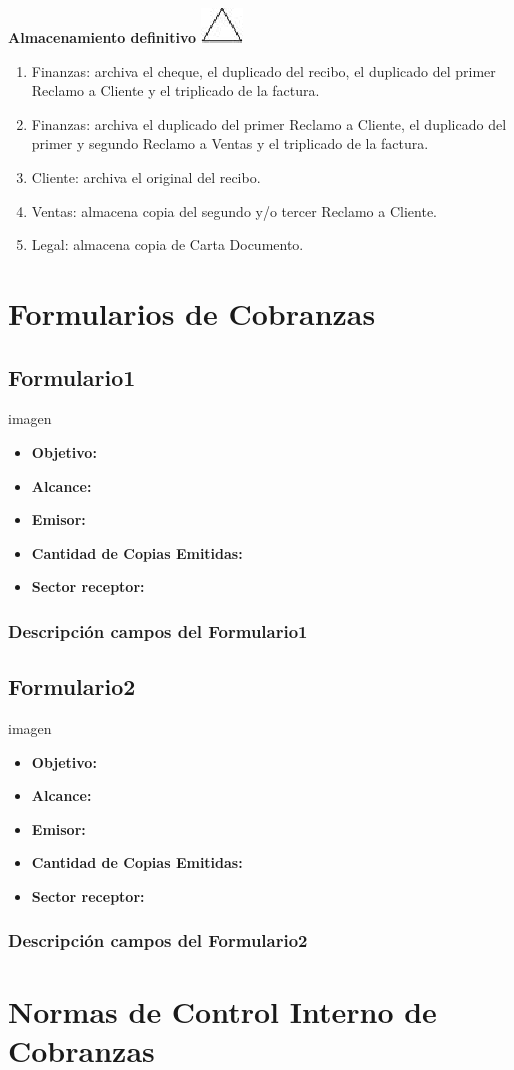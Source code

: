 \begin{center}
  \textbf{Almacenamiento definitivo}
  \includegraphics{./Images/Simbolos/simbolo-Almacenamiento-Definitivo.png}
\end{center}
\begin{enumerate}
\item Finanzas: archiva el cheque, el duplicado del recibo, el duplicado del primer Reclamo a Cliente y el triplicado de la factura.
\item Finanzas: archiva el duplicado del primer Reclamo a Cliente, el duplicado del primer y segundo Reclamo a Ventas y el triplicado de la factura.
\item Cliente: archiva el original del recibo.
\item Ventas: almacena copia del segundo y/o tercer Reclamo a Cliente.
\item Legal: almacena copia de Carta Documento.
\end{enumerate}

\pagebreak
\section{Formularios de Cobranzas}
\subsection{Formulario1}
imagen
\begin{itemize}
  \item \textbf{Objetivo:}
  \item \textbf{Alcance:}
  \item \textbf{Emisor:}
  \item \textbf{Cantidad de Copias Emitidas:}
  \item \textbf{Sector receptor:}
 \end{itemize}
\subsubsection{Descripci\'on campos del Formulario1}

\subsection{Formulario2}
imagen
\begin{itemize}
  \item \textbf{Objetivo:}
  \item \textbf{Alcance:}
  \item \textbf{Emisor:}
  \item \textbf{Cantidad de Copias Emitidas:}
  \item \textbf{Sector receptor:}
 \end{itemize}
\subsubsection{Descripci\'on campos del Formulario2}

\pagebreak
\section{Normas de Control Interno de Cobranzas}
